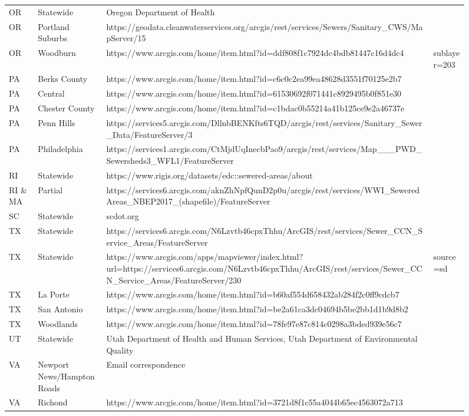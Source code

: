 \documentclass[
  letterpaper,
  DIV=11,
  numbers=noendperiod]{scrartcl}
\begin{document}
\begin{figure}
{\begin{table}
\begin{tabular*}{\linewidth}{@{\extracolsep{\fill}}lll}
OR & Statewide & Oregon Department of Health \\ 
OR & Portland Suburbs  & https://geodata.cleanwaterservices.org/arcgis/rest/services/Sewers/Sanitary_CWS/MapServer/15 \\ 
OR & Woodburn  & https://www.arcgis.com/home/item.html?id=ddf808f1c7924dc4bdb81447c16d4dc4&sublayer=203 \\ 
PA & Berks County  & https://www.arcgis.com/home/item.html?id=c6c0c2ea99ea48628d3551f70125e2b7 \\ 
PA & Central  & https://www.arcgis.com/home/item.html?id=61530692f071441c8929495b0f851e30 \\ 
PA & Chester County  & https://www.arcgis.com/home/item.html?id=c1bdac0b55214a41b125ce9e2a46737e \\ 
PA & Penn Hills  & https://services5.arcgis.com/DllnbBENKfts6TQD/arcgis/rest/services/Sanitary_Sewer_Data/FeatureServer/3 \\ 
PA & Philadelphia  & https://services1.arcgis.com/CtMjdUqInecbPao9/arcgis/rest/services/Map___PWD_Sewersheds3_WFL1/FeatureServer \\ 
RI & Statewide & https://www.rigis.org/datasets/edc::sewered-areas/about \\ 
RI \& MA & Partial & https://services6.arcgis.com/aknZhNpfQunD2p0u/arcgis/rest/services/WWI_SeweredAreas_NBEP2017_(shapefile)/FeatureServer \\ 
SC & Statewide & scdot.org \\ 
TX & Statewide & https://services6.arcgis.com/N6Lzvtb46cpxThhu/ArcGIS/rest/services/Sewer_CCN_Service_Areas/FeatureServer \\ 
TX & Statewide & https://www.arcgis.com/apps/mapviewer/index.html?url=https://services6.arcgis.com/N6Lzvtb46cpxThhu/ArcGIS/rest/services/Sewer_CCN_Service_Areas/FeatureServer/230&source=sd \\ 
TX & La Porte  & https://www.arcgis.com/home/item.html?id=b60af554d658432ab284f2c0ff9cdcb7 \\ 
TX & San Antonio  & https://www.arcgis.com/home/item.html?id=be2a61ca3dc04694b5be2bb1d1b9d8b2 \\ 
TX & Woodlands  & https://www.arcgis.com/home/item.html?id=78fe97e87c814c0298a3bded939e56c7 \\ 
UT & Statewide & Utah Department of Health and Human Services, Utah Department of Environmental Quality \\ 
VA & Newport News/Hampton Roads  & Email correspondence \\ 
VA & Richond  & https://www.arcgis.com/home/item.html?id=3721d8f1c55a4044b65ec4563072a713 \\ 

\end{tabular*}
\end{table}}
\end{figure}
\end{document}
